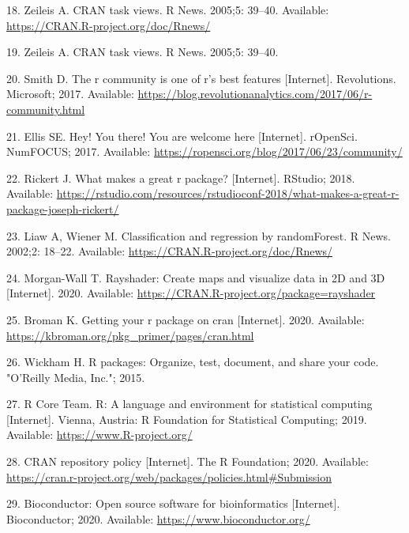\documentclass[10pt,letterpaper]{article}
\begin{document}
\leavevmode\hypertarget{ref-ctv}{}%
18. Zeileis A. CRAN task views. R News. 2005;5: 39--40. Available:
\url{https://CRAN.R-project.org/doc/Rnews/}

\leavevmode\hypertarget{ref-zeileis2005}{}%
19. Zeileis A. CRAN task views. R News. 2005;5: 39--40.

\leavevmode\hypertarget{ref-smith2017}{}%
20. Smith D. The r community is one of r's best features {[}Internet{]}.
Revolutions. Microsoft; 2017. Available:
\url{https://blog.revolutionanalytics.com/2017/06/r-community.html}

\leavevmode\hypertarget{ref-ellis2017}{}%
21. Ellis SE. Hey! You there! You are welcome here {[}Internet{]}.
rOpenSci. NumFOCUS; 2017. Available:
\url{https://ropensci.org/blog/2017/06/23/community/}

\leavevmode\hypertarget{ref-rickert2018}{}%
22. Rickert J. What makes a great r package? {[}Internet{]}. RStudio;
2018. Available:
\url{https://rstudio.com/resources/rstudioconf-2018/what-makes-a-great-r-package-joseph-rickert/}

\leavevmode\hypertarget{ref-randomforest}{}%
23. Liaw A, Wiener M. Classification and regression by randomForest. R
News. 2002;2: 18--22. Available:
\url{https://CRAN.R-project.org/doc/Rnews/}

\leavevmode\hypertarget{ref-rayshader}{}%
24. Morgan-Wall T. Rayshader: Create maps and visualize data in 2D and
3D {[}Internet{]}. 2020. Available:
\url{https://CRAN.R-project.org/package=rayshader}

\leavevmode\hypertarget{ref-broman2020}{}%
25. Broman K. Getting your r package on cran {[}Internet{]}. 2020.
Available: \url{https://kbroman.org/pkg_primer/pages/cran.html}

\leavevmode\hypertarget{ref-wickham2015}{}%
26. Wickham H. R packages: Organize, test, document, and share your
code. "O'Reilly Media, Inc."; 2015.

\leavevmode\hypertarget{ref-baseR}{}%
27. R Core Team. R: A language and environment for statistical computing
{[}Internet{]}. Vienna, Austria: R Foundation for Statistical Computing;
2019. Available: \url{https://www.R-project.org/}

\leavevmode\hypertarget{ref-cranpolicy2020}{}%
28. CRAN repository policy {[}Internet{]}. The R Foundation; 2020.
Available:
\url{https://cran.r-project.org/web/packages/policies.html\#Submission}

\leavevmode\hypertarget{ref-bioconductor}{}%
29. Bioconductor: Open source software for bioinformatics
{[}Internet{]}. Bioconductor; 2020. Available:
\url{https://www.bioconductor.org/}
\end{document}
